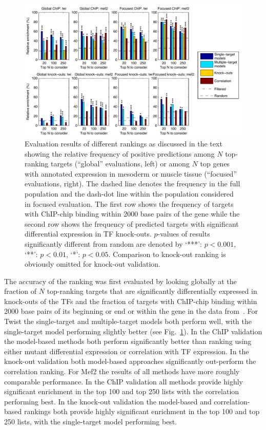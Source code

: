 \documentclass{pnastwo}
\begin{document}
\begin{article}
\begin{figure}[tb]
  \centering
  \includegraphics{fig3}
  \caption{Evaluation results of different rankings as
    discussed in the text showing the relative frequency of positive
    predictions among $N$ top-ranking targets (``global'' evaluations,
    left) or among $N$ top genes
    with annotated expression in mesoderm or muscle tissue
    (``focused'' evaluations, right).
    The dashed line
    denotes the frequency in the full population and the dash-dot
    line within the population considered in focused evaluation.
    The first row shows the frequency of targets with ChIP-chip
    binding within 2000 base pairs of the gene
    while the second row shows the frequency of
    predicted targets with significant differential
    expression in TF knock-outs.
    $p$-values of results significantly different from random are
    denoted by `***': $p <
    0.001$, `**': $p < 0.01$, `*': $p < 0.05$.
    Comparison to knock-out ranking is obviously omitted for knock-out
    validation. \label{fig:dros_global_evaluation}
  }
\end{figure}

The accuracy of the ranking was first evaluated by looking globally at the fraction of $N$ top-ranking targets that are significantly differentially expressed in knock-outs of the TFs and the fraction
of targets with ChIP-chip binding within 2000 base
pairs of its beginning or end or within the gene in the data
from~\cite{Zinzen2009}. For Twist the single-target and
multiple-target models both perform well, with the single-target model
performing slightly better (see
Fig.~\ref{fig:dros_global_evaluation}). In the ChIP validation the
model-based methods both perform significantly better than ranking
using either mutant differential expression or correlation with TF
expression. In the knock-out validation both model-based approaches
significantly out-perform the correlation ranking. For Mef2 the results of all
methods have more roughly comparable performance. In the ChIP validation all
methods provide highly significant enrichment in the top 100 and top
250 lists with the correlation performing best. In the knock-out
validation the model-based and correlation-based rankings both provide
highly significant enrichment in the top 100 and top 250 lists, with
the single-target model performing best.


\end{article}
\end{document}
